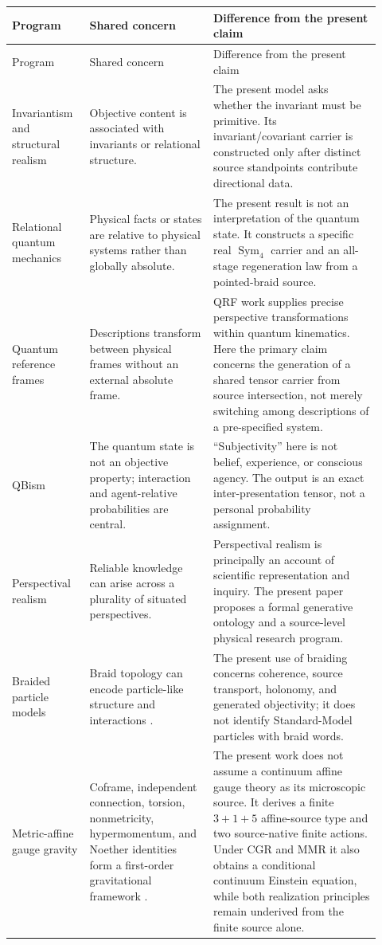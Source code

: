 \documentclass[11pt]{article}
\theoremstyle{definition}
\theoremstyle{remark}
\newcommand{\Sym}{\operatorname{Sym}}
\begin{document}
{\small\setlength{\parskip}{0pt}
\begin{longtable}{>{\raggedright\arraybackslash}p{0.19\linewidth}>{\raggedright\arraybackslash}p{0.31\linewidth}>{\raggedright\arraybackslash}p{0.42\linewidth}}
\toprule
Program & Shared concern & Difference from the present claim \\
\midrule
\endfirsthead
\toprule
Program & Shared concern & Difference from the present claim \\
\midrule
\endhead
Invariantism and structural realism & Objective content is associated with invariants or relational structure. & The present model asks whether the invariant must be primitive. Its invariant/covariant carrier is constructed only after distinct source standpoints contribute directional data. \\
Relational quantum mechanics & Physical facts or states are relative to physical systems rather than globally absolute. & The present result is not an interpretation of the quantum state. It constructs a specific real $\Sym_4$ carrier and an all-stage regeneration law from a pointed-braid source. \\
Quantum reference frames & Descriptions transform between physical frames without an external absolute frame. & QRF work supplies precise perspective transformations within quantum kinematics. Here the primary claim concerns the generation of a shared tensor carrier from source intersection, not merely switching among descriptions of a pre-specified system. \\
QBism & The quantum state is not an objective property; interaction and agent-relative probabilities are central. & ``Subjectivity'' here is not belief, experience, or conscious agency. The output is an exact inter-presentation tensor, not a personal probability assignment. \\
Perspectival realism & Reliable knowledge can arise across a plurality of situated perspectives. & Perspectival realism is principally an account of scientific representation and inquiry. The present paper proposes a formal generative ontology and a source-level physical research program. \\
Braided particle models & Braid topology can encode particle-like structure and interactions \cite{bilsonthompson2005}. & The present use of braiding concerns coherence, source transport, holonomy, and generated objectivity; it does not identify Standard-Model particles with braid words. \\
Metric-affine gauge gravity & Coframe, independent connection, torsion, nonmetricity, hypermomentum, and Noether identities form a first-order gravitational framework \cite{hehl1995}. & The present work does not assume a continuum affine gauge theory as its microscopic source. It derives a finite $3+1+5$ affine-source type and two source-native finite actions. Under CGR and MMR it also obtains a conditional continuum Einstein equation, while both realization principles remain underived from the finite source alone. \\

\end{longtable}}
\end{document}

